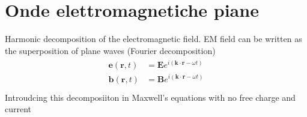 \documentclass[letterpaper,10pt,italian]{jupyterBook}
\begin{document}
\section{Onde elettromagnetiche piane}
\label{\detokenize{ch/waves-plane:onde-elettromagnetiche-piane}}\label{\detokenize{ch/waves-plane:classical-electromagnetism-waves-plane-waves}}\label{\detokenize{ch/waves-plane::doc}}
\sphinxAtStartPar
Harmonic decomposition of the electromagnetic field. EM field can be written as the superposition of plane waves (Fourier decomposition)
\begin{equation*}
\begin{split}\begin{aligned}
  \mathbf{e}(\mathbf{r},t) & = \mathbf{E} e^{i(\mathbf{k} \cdot \mathbf{r} - \omega t)} \\
  \mathbf{b}(\mathbf{r},t) & = \mathbf{B} e^{i(\mathbf{k} \cdot \mathbf{r} - \omega t)} \\
\end{aligned}\end{split}
\end{equation*}
\sphinxAtStartPar
Introudcing this decomposiiton in Maxwell’s equations with no free charge and current
\end{document}
